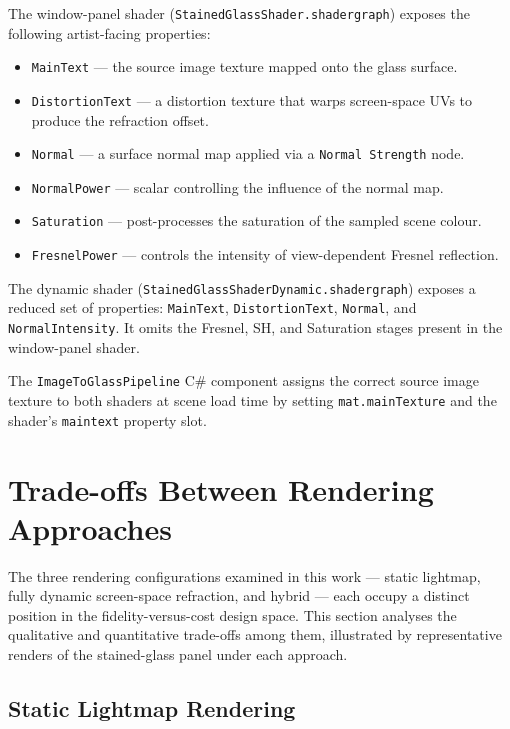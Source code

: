 \documentclass[12pt]{article}
\begin{document}
The window-panel shader (\texttt{StainedGlassShader.shadergraph}) exposes the following artist-facing properties:
\begin{itemize}
  \item \texttt{MainText} --- the source image texture mapped onto the glass surface.
  \item \texttt{DistortionText} --- a distortion texture that warps screen-space UVs to produce the refraction offset.
  \item \texttt{Normal} --- a surface normal map applied via a \texttt{Normal Strength} node.
  \item \texttt{NormalPower} --- scalar controlling the influence of the normal map.
  \item \texttt{Saturation} --- post-processes the saturation of the sampled scene colour.
  \item \texttt{FresnelPower} --- controls the intensity of view-dependent Fresnel reflection.
\end{itemize}

The dynamic shader (\texttt{StainedGlassShaderDynamic.shadergraph}) exposes a reduced set of properties: \texttt{MainText}, \texttt{DistortionText}, \texttt{Normal}, and \texttt{NormalIntensity}. It omits the Fresnel, SH, and Saturation stages present in the window-panel shader.

The \texttt{ImageToGlassPipeline} C\# component assigns the correct source image texture to both shaders at scene load time by setting \texttt{mat.mainTexture} and the shader's \texttt{maintext} property slot.

\clearpage
\section{Trade-offs Between Rendering Approaches}
\label{sec:tradeoffs}

The three rendering configurations examined in this work --- static lightmap, fully dynamic screen-space refraction, and hybrid --- each occupy a distinct position in the fidelity-versus-cost design space. This section analyses the qualitative and quantitative trade-offs among them, illustrated by representative renders of the stained-glass panel under each approach.

\subsection{Static Lightmap Rendering}
\end{document}
